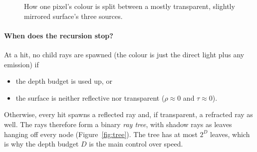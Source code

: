 \documentclass[11pt,a4paper]{article}
\begin{document}
\begin{figure}[h]
\centering
{}
\caption{How one pixel's colour is split between a mostly transparent, slightly
mirrored surface's three sources.}
\end{figure}

\paragraph{When does the recursion stop?} At a hit, no child rays are spawned
(the colour is just the direct light plus any emission) if
\begin{itemize}[leftmargin=1.4em]
  \item the depth budget is used up, or
  \item the surface is neither reflective nor transparent ($\rho\approx0$ and
        $\tau\approx0$).
\end{itemize}
Otherwise, every hit spawns a reflected ray and, if transparent, a refracted ray
as well. The rays therefore form a binary \emph{ray tree}, with shadow rays as
leaves hanging off every node (Figure~\ref{fig:tree}). The tree has at most
$2^{D}$ leaves, which is why the depth budget $D$ is the main control over speed.
\end{document}
